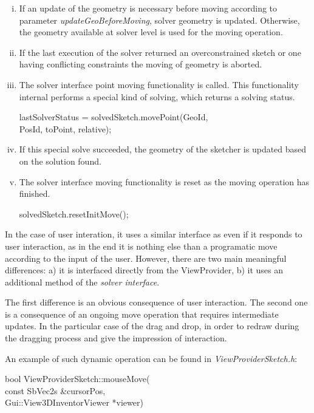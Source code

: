 \documentclass[12pt,twoside,a4paper]{book}
\begin{document}
    \begin{enumerate}[(i)]
     \item If an update of the geometry is necessary before moving according to parameter \emph{updateGeoBeforeMoving}, solver geometry is updated. Otherwise, the geometry available at solver level is used for the moving operation.
     \item If the last execution of the solver returned an overconstrained sketch or one having conflicting constraints the moving of geometry is aborted.
     \item The solver interface point moving functionality is called. This functionality internal performs a special kind of solving, which returns a solving status.
        \begin{codequote}
        lastSolverStatus = solvedSketch.movePoint(GeoId, \\
        \-\hspace{4.5cm}PosId, toPoint, relative);
        \end{codequote}
    \item If this special solve succeeded, the geometry of the sketcher is updated based on the solution found.
     \item The solver interface moving functionality is reset as the moving operation has finished.
        \begin{codequote}
        solvedSketch.resetInitMove();
        \end{codequote}
    \end{enumerate}

    In the case of user interation, it uses a similar interface as even if it responds to user interaction, as in the end it is nothing else than a programatic move according to the input of the user. However, there are two main meaningful differences: a) it is interfaced directly from the ViewProvider, b) it uses an additional method of the \emph{solver interface}.

    The first difference is an obvious consequence of user interaction. The second one is a consequence of an ongoing move operation that requires intermediate updates. In the particular case of the drag and drop, in order to redraw during the dragging process and give the impression of interaction.

    An example of such dynamic operation can be found in \emph{ViewProviderSketch.h}:

    \begin{codequote}
    bool ViewProviderSketch::mouseMove(\\
    \-\hspace{4cm}const SbVec2s \&cursorPos,\\
    \-\hspace{4cm}Gui::View3DInventorViewer *viewer)
    \end{codequote}
\end{document}

